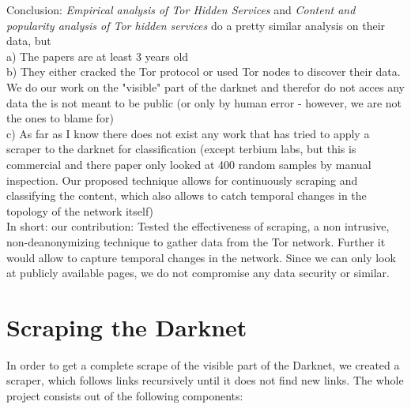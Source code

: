 \documentclass[USenglish,oneside,twocolumn]{article}
\begin{document}
Conclusion: \textit{Empirical analysis of Tor Hidden Services} and \textit{Content and popularity analysis of Tor hidden services} do a pretty similar analysis on their data, but\\
a) The papers are at least 3 years old \\
b) They either cracked the Tor protocol or used Tor nodes to discover their data. We do our work on the "visible" part of the darknet and therefor do not acces any data the is not meant to be public (or only by human error - however, we are not the ones to blame for)\\
c) As far as I know there does not exist any work that has tried to apply a scraper to the darknet for classification (except terbium labs, but this is commercial and there paper only looked at 400 random samples by manual inspection. Our proposed technique allows for continuously scraping and classifying the content, which also allows to catch temporal changes in the topology of the network itself)\\
In short: our contribution: Tested the effectiveness of scraping, a non intrusive, non-deanonymizing technique to gather data from the Tor network. Further it would allow to capture temporal changes in the network. Since we can only look at publicly available pages, we do not compromise any data security or similar.

\section{Scraping the Darknet}

In order to get a complete scrape of the visible part of the Darknet, we created a scraper, which follows links recursively until it does not find new links.
The whole project consists out of the following components:
\end{document}
